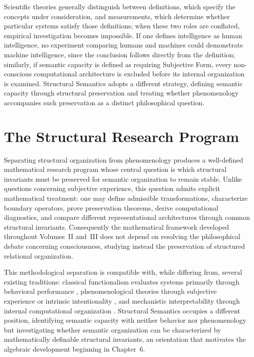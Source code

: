 \documentclass[11pt,twoside,openright]{book}
\numberwithin{equation}{chapter}
\theoremstyle{definition}
\theoremstyle{plain}
\theoremstyle{remark}
\theoremstyle{definition}
\begin{document}
Scientific theories generally distinguish between definitions, which
specify the concepts under consideration, and measurements, which
determine whether particular systems satisfy those definitions; when
these two roles are conflated, empirical investigation becomes
impossible. If one defines intelligence as human intelligence, no
experiment comparing humans and machines could demonstrate machine
intelligence, since the conclusion follows directly from the definition;
similarly, if semantic capacity is defined as requiring Subjective Form,
every non-conscious computational architecture is excluded before its
internal organization is examined. Structural Semantics adopts a
different strategy, defining semantic capacity through structural
preservation and treating whether phenomenology accompanies such
preservation as a distinct philosophical question.

\section{The Structural Research Program}

Separating structural organization from phenomenology produces a
well-defined mathematical research program whose central question is
which structural invariants must be preserved for semantic organization
to remain stable. Unlike questions concerning subjective experience, this
question admits explicit mathematical treatment: one may define
admissible transformations, characterize boundary operators, prove
preservation theorems, derive computational diagnostics, and compare
different representational architectures through common structural
invariants. Consequently the mathematical framework developed throughout
Volumes~II and~III does not depend on resolving the philosophical debate
concerning consciousness, studying instead the preservation of
structured relational organization.

This methodological separation is compatible with, while differing from,
several existing traditions: classical functionalism evaluates systems
primarily through behavioral performance \cite{Putnam1967,Fodor1975},
phenomenological theories through subjective experience or intrinsic
intentionality \cite{Nagel1974,Searle1980}, and mechanistic
interpretability through internal computational organization
\cite{Olah2020,Elhage2021}. Structural Semantics occupies a different
position, identifying semantic capacity with neither behavior nor
phenomenology but investigating whether semantic organization can be
characterized by mathematically definable structural invariants, an
orientation that motivates the algebraic development beginning in
Chapter~6.
\end{document}

